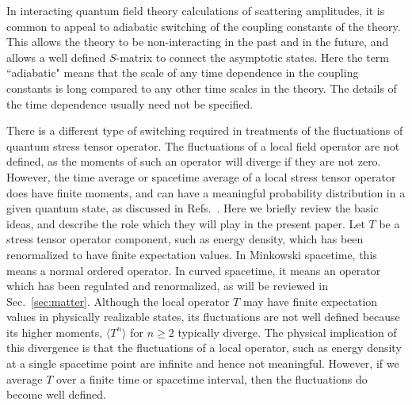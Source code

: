 \documentclass[preprint,prd,showpacs,superscriptaddress]{revtex4}
\begin{document}
In interacting quantum field theory calculations of scattering amplitudes, it is common to appeal to adiabatic switching
of the coupling constants of the theory. This allows the theory to be non-interacting in the past and in the future, and
allows a well defined $S$-matrix to connect the asymptotic states. Here the term ``adiabatic" means that the scale
of any time dependence in the coupling constants is long compared to any other time scales in the theory. The details
of the time dependence usually need not be specified. 

There is a different type of switching required in treatments of the fluctuations of quantum stress tensor operator.
The fluctuations of a local field operator are not defined, as the moments of such an operator will diverge if they
are  not zero. However, the time average or spacetime average of a local stress tensor operator does have finite
moments, and can have a meaningful probability distribution in a given quantum state, as discussed in 
Refs.~\cite{FFR10,FFR12,FF15}. Here we briefly review the basic ideas, and describe the role which they will play
in the present paper. Let $T$ be a stress tensor operator component, such as energy density, which has been 
renormalized to have  finite expectation values. In Minkowski spacetime, this means a normal ordered operator. 
In curved spacetime, it means an operator which has been regulated and renormalized, as will be reviewed in 
Sec.~\ref{sec:matter}. Although the local operator $T$ may have finite expectation values in physically realizable
states, its fluctuations are not well defined because its higher moments, $\langle T^n \rangle$ for $n \geq 2$ typically
diverge. The physical implication of this divergence is that the fluctuations of a local operator, such as energy density
at a single spacetime point are infinite and hence not meaningful. However, if we average $T$ over a finite time or
spacetime interval, then the fluctuations do become well defined.
\end{document}
